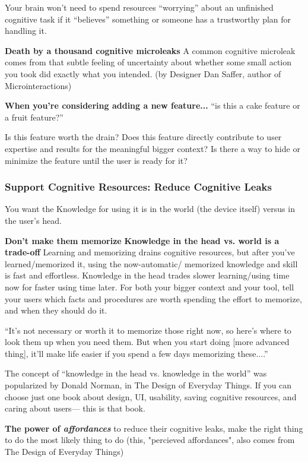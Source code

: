 Your brain won’t need to spend resources “worrying” about an unfinished cognitive task if it “believes” something or someone has a trustworthy plan for handling it.

\textbf{Death by a thousand cognitive microleaks}
A common cognitive microleak comes from that subtle feeling of uncertainty about whether some small action you took did exactly what you intended. (by Designer Dan Saffer, author of Microinteractions)

\textbf{When you’re considering adding a new feature...}
“is this a cake feature or a fruit feature?”

Is this feature worth the drain?
Does this feature directly contribute to user expertise and
results for the meaningful bigger context?
Is there a way to hide or minimize the feature until the user is ready for it?

\subsubsection{Support Cognitive Resources: Reduce Cognitive Leaks}
You want the Knowledge for using it is in the world (the device itself) versus in the user's head.

\textbf{Don’t make them memorize}
\textbf{Knowledge in the head vs. world is a trade-off}
Learning and memorizing drains cognitive resources, but after you’ve learned/memorized it, using the now-automatic/ memorized knowledge and skill is fast and effortless. Knowledge in the head trades slower learning/using time now for faster using time later.
For both your bigger context and your tool, tell your users which facts and procedures are worth spending the effort to memorize, and when they should do it.

“It’s not necessary or worth it to memorize those right now, so here’s where to look them up when you need them. But when you start doing [more advanced thing], it’ll make life easier if you spend a few days memorizing these....”

The concept of “knowledge in the head vs. knowledge in the world” was popularized by Donald Norman, in The Design of Everyday Things. If you can choose just one book about design, UI, usability, saving cognitive resources, and caring about users— this is that book.

\textbf{The power of \textit{affordances}}
to reduce their cognitive leaks, make the right thing to do the most likely thing to do (this, "percieved affordances", also comes from The Design of Everyday Things)

